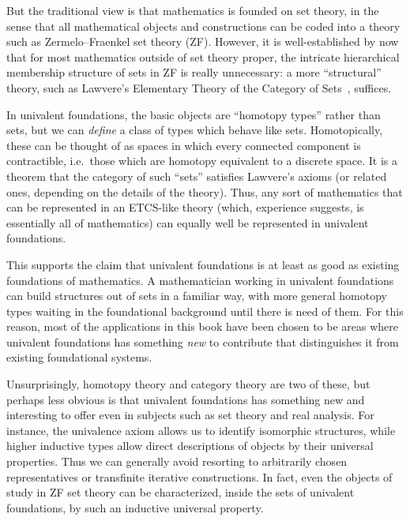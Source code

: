 But the traditional view is that mathematics is founded on set theory, in the sense that all mathematical objects and constructions can be coded into a theory such as Zermelo--Fraenkel set theory (ZF).
However, it is well-established by now that for most mathematics outside of set theory proper, the intricate hierarchical membership structure of sets in ZF is really unnecessary: a more ``structural'' theory, such as Lawvere's Elementary Theory of the Category of Sets~\citep{lawvere:etcs-long}, suffices.
%

In univalent foundations, the basic objects are ``homotopy types'' rather than sets, but we can \emph{define} a class of types which behave like sets.
Homotopically, these can be thought of as spaces in which every connected component is contractible, i.e.\ those which are homotopy equivalent to a discrete space.
It is a theorem  that the category of such ``sets'' satisfies Lawvere's axioms (or related ones, depending on the details of the theory).
Thus, any sort of mathematics that can be represented in an ETCS-like theory (which, experience suggests, is essentially all of mathematics) can equally well be represented in univalent foundations.  

This supports the claim that univalent foundations is at least as good as existing foundations of mathematics.
A mathematician working in univalent foundations can build structures out of sets in a familiar way, with more general homotopy types waiting in the foundational background until there is need of them.
For this reason, most of the applications in this book have been chosen to be areas where univalent foundations has something \emph{new} to contribute that distinguishes it from existing foundational systems.

Unsurprisingly, homotopy theory and category theory are two of these, but perhaps less obvious is that univalent foundations has something new and interesting to offer even in subjects such as set theory and real analysis.
For instance, the univalence axiom allows us to identify isomorphic structures, while higher inductive types allow direct descriptions of objects by their universal properties.
Thus we can generally avoid resorting to arbitrarily chosen representatives or transfinite iterative constructions.
In fact, even the objects of study in ZF set theory can be characterized, inside the sets of univalent foundations, by such an inductive universal property.

